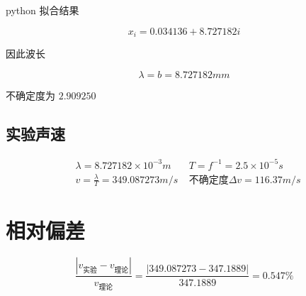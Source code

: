 \documentclass[12pt,a4paper]{amsart}
\begin{document}
python 拟合结果

\begin{equation}
    x_i = 0.034136 + 8.727182 i
\end{equation}

因此波长

\begin{equation}
    \lambda = b = 8.727182 mm
\end{equation}

不确定度为 $2.909250$

\subsection{实验声速}

\begin{equation}
    \begin{aligned}
        &\lambda = 8.727182 \times 10^{-3} m\quad &T = f^{-1} = 2.5\times 10^{-5} s \\
        &v = \frac{\lambda}{T} = 349.087273 m/s   &\text{不确定度} \Delta v = 116.37 m/s
    \end{aligned}
\end{equation}

\section{相对偏差}

\begin{equation}
    \frac{|v_{\text{实验}} - v_{\text{理论}}|}{v_{\text{理论}}} = \frac{|349.087273 - 347.1889|}{347.1889} = 0.547\%
\end{equation}

\appendix


{\footnotesize}
\end{document}
